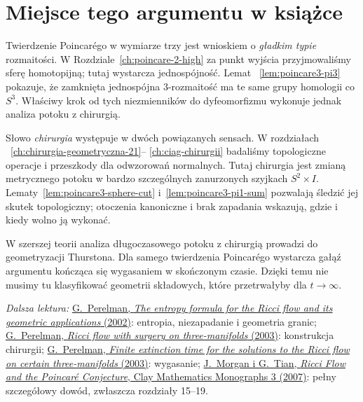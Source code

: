 \section{Miejsce tego argumentu w książce}
\label{sec:poincare3-miejsce}

Twierdzenie Poincarégo w wymiarze trzy jest
wnioskiem o \emph{gładkim typie} rozmaitości.
W Rozdziale~\ref{ch:poincare-2-high} za punkt
wyjścia przyjmowaliśmy sferę homotopijną;
tutaj wystarcza jednospójność. Lemat
~\ref{lem:poincare3-pi3} pokazuje, że
zamknięta jednospójna $3$-rozmaitość ma
te same grupy homologii co $S^3$.
Właściwy krok od tych niezmienników do
dyfeomorfizmu wykonuje jednak analiza
potoku z chirurgią.

Słowo \emph{chirurgia} występuje w dwóch
powiązanych sensach. W rozdziałach
~\ref{ch:chirurgia-geometryczna-21}--
\ref{ch:ciag-chirurgii} badaliśmy topologiczne
operacje i przeszkody dla odwzorowań normalnych.
Tutaj chirurgia jest zmianą metrycznego potoku
w bardzo szczególnych zanurzonych szyjkach
$S^2\times I$. Lematy~\ref{lem:poincare3-sphere-cut}
i~\ref{lem:poincare3-pi1-sum} pozwalają
śledzić jej skutek topologiczny; otoczenia
kanoniczne i brak zapadania wskazują,
gdzie i kiedy wolno ją wykonać.

W szerszej teorii analiza długoczasowego
potoku z chirurgią prowadzi do geometryzacji
Thurstona. Dla samego twierdzenia Poincarégo
wystarcza gałąź argumentu kończąca się
wygasaniem w skończonym czasie. Dzięki temu
nie musimy tu klasyfikować geometrii
składowych, które przetrwałyby dla
$t\to\infty$.

\par\smallskip
{\footnotesize\noindent\emph{Dalsza lektura:}
\href{https://arxiv.org/pdf/math/0211159}
{G.\ Perelman, \emph{The entropy formula for the Ricci
flow and its geometric applications} (2002)}:
entropia, niezapadanie i geometria granic;
\href{https://arxiv.org/pdf/math/0303109}
{G.\ Perelman, \emph{Ricci flow with surgery on
three-manifolds} (2003)}: konstrukcja chirurgii;
\href{https://arxiv.org/pdf/math/0307245}
{G.\ Perelman, \emph{Finite extinction time for
the solutions to the Ricci flow on certain
three-manifolds} (2003)}: wygasanie;
\href{https://www.claymath.org/library/monographs/cmim03.pdf}
{J.\ Morgan i G.\ Tian, \emph{Ricci Flow and the
Poincaré Conjecture}, Clay Mathematics Monographs 3
(2007)}: pełny szczegółowy dowód, zwłaszcza
rozdziały 15--19.\par}

